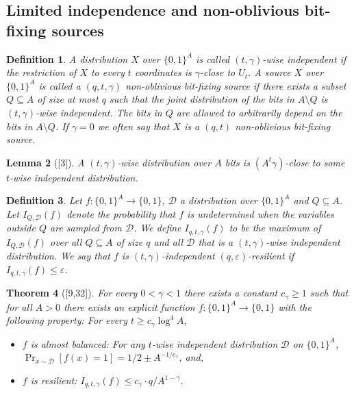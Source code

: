 \documentclass[10pt,a4paper]{article}
\newtheorem{theorem}{Theorem}
\newtheorem{definition}[theorem]{Definition}
\newtheorem{lemma}[theorem]{Lemma}
\begin{document}
\subsection*{Limited independence and non-oblivious bit-fixing sources}
\begin{definition}
A distribution $X$ over $\{0,1\}^A$ is called $(t,\gamma)$-wise independent if the restriction of $X$ to every $t$ coordinates is $\gamma$-close to $U_t$. A source $X$ over $\{0,1\}^A$ is called a $(q,t,\gamma)$ non-oblivious bit-fixing source if there exists a subset $Q\subseteq A$ of size at most $q$ such that the joint distribution of the bits in $A\setminus Q$ is $(t,\gamma)$-wise independent. The bits in $Q$ are allowed to arbitrarily depend on the bits in $A\setminus Q$. If $\gamma=0$ we often say that $X$ is a $(q,t)$ non-oblivious bit-fixing source.
\end{definition}
\begin{lemma}[{[3]}]A $(t,\gamma)$-wise distribution over $A$ bits is $(A^t\gamma)$-close to some $t$-wise independent distribution.\end{lemma}
\begin{definition}
Let $f:\{0,1\}^A\to\{0,1\}$, $\mathcal D$ a distribution over $\{0,1\}^A$ and $Q\subseteq A$. Let $I_{Q,\mathcal D}(f)$ denote the probability that $f$ is undetermined when the variables outside $Q$ are sampled from $\mathcal D$. We define $I_{q,t,\gamma}(f)$ to be the maximum of $I_{Q,\mathcal D}(f)$ over all $Q\subseteq A$ of size $q$ and all $\mathcal D$ that is a $(t,\gamma)$-wise independent distribution. We say that $f$ is $(t,\gamma)$-independent $(q,\varepsilon)$-resilient if $I_{q,t,\gamma}(f)\le\varepsilon$.
\end{definition}
\begin{theorem}[{[9,32]}]
For every $0<\gamma<1$ there exists a constant $c_\gamma\ge1$ such that for all $A>0$ there exists an explicit function $f:\{0,1\}^A\to\{0,1\}$ with the following property: For every $t\ge c_\gamma\log^4 A$,
\begin{itemize}
\item $f$ is almost balanced: For any $t$-wise independent distribution $\mathcal D$ on $\{0,1\}^A$, $\Pr_{x\sim\mathcal D}[f(x)=1]=1/2\pm A^{-1/c_\gamma}$, and,
\item $f$ is resilient: $I_{q,t,\gamma}(f)\le c_\gamma\cdot q/A^{1-\gamma}$.
\end{itemize}
\end{theorem}
\end{document}
